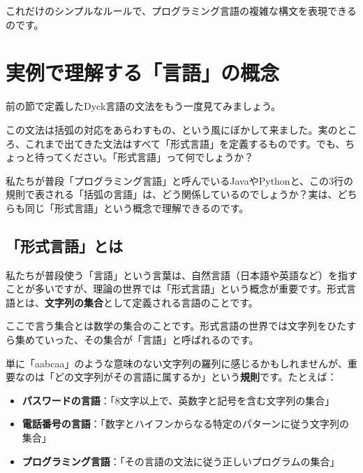 これだけのシンプルなルールで、プログラミング言語の複雑な構文を表現できるのです。

\hypertarget{chapter4-ux5b9fux4f8bux3067ux7406ux89e3ux3059ux308bux8a00ux8a9eux306eux6982ux5ff5}{%
\section{実例で理解する「言語」の概念}\label{chapter4-ux5b9fux4f8bux3067ux7406ux89e3ux3059ux308bux8a00ux8a9eux306eux6982ux5ff5}}

前の節で定義したDyck言語の文法をもう一度見てみましょう。

\begin{Shaded}
\begin{Highlighting}[]
\end{Highlighting}
\end{Shaded}

この文法は括弧の対応をあらわすもの、という風にぼかして来ました。実のところ、これまで出てきた文法はすべて「形式言語」を定義するものです。でも、ちょっと待ってください。「形式言語」って何でしょうか？

私たちが普段「プログラミング言語」と呼んでいるJavaやPythonと、この3行の規則で表される「括弧の言語」は、どう関係しているのでしょうか？実は、どちらも同じ「形式言語」という概念で理解できるのです。

\hypertarget{chapter4-ux5f62ux5f0fux8a00ux8a9eux3068ux306f}{%
\subsection{「形式言語」とは}\label{chapter4-ux5f62ux5f0fux8a00ux8a9eux3068ux306f}}

私たちが普段使う「言語」という言葉は、自然言語（日本語や英語など）を指すことが多いですが、理論の世界では「形式言語」という概念が重要です。形式言語とは、\textbf{文字列の集合}として定義される言語のことです。

ここで言う集合とは数学の集合のことです。形式言語の世界では文字列をひたすら集めていった、その集合が「言語」と呼ばれるのです。

単に「aabcaa」のような意味のない文字列の羅列に感じるかもしれませんが、重要なのは「どの文字列がその言語に属するか」という\textbf{規則}です。たとえば：

\begin{itemize}
\tightlist
\item
  \textbf{パスワードの言語}：「8文字以上で、英数字と記号を含む文字列の集合」
\item
  \textbf{電話番号の言語}：「数字とハイフンからなる特定のパターンに従う文字列の集合」
\item
  \textbf{プログラミング言語}：「その言語の文法に従う正しいプログラムの集合」
\end{itemize}

